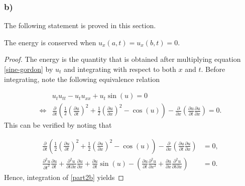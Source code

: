 \subsubsection*{b)} 
The following statement is proved in this section.
\begin{mydef}
The energy is conserved when $u_x(a,t) = u_x(b,t) = 0$.
\end{mydef}
\begin{proof}
The energy is the quantity that is obtained after multiplying equation \eqref{sine-gordon} by $u_t$ and integrating with respect to both $x$ and $t$. Before integrating, note the following equivalence relation

\begin{equation}
\begin{split}
    &u_tu_{tt} - u_tu_{xx} + u_t\sin{(u)} = 0 \\
    \iff &\frac{\partial}{\partial t}\left(\frac{1}{2}\left(\frac{\partial u}{\partial t}\right)^2 + \frac{1}{2}\left(\frac{\partial u}{\partial x}\right)^2 - \cos{(u)}\right) - \frac{\partial }{\partial x}\left(\frac{\partial u}{\partial t}\frac{\partial u}{\partial x}\right) = 0.
\label{part2b}
\end{split}
\end{equation}
This can be verified by noting that

\begin{equation*}
\begin{split}
    \frac{\partial}{\partial t}\left(\frac{1}{2}\left(\frac{\partial u}{\partial t}\right)^2 + \frac{1}{2}\left(\frac{\partial u}{\partial x}\right)^2 - \cos{(u)}\right) - \frac{\partial }{\partial x}\left(\frac{\partial u}{\partial t}\frac{\partial u}{\partial x}\right) &= 0, \\
    \frac{\partial^2 u}{\partial t^2}\frac{\partial u}{\partial t} + \frac{\partial^2 u}{\partial t \partial x}\frac{\partial u}{\partial x} + \frac{\partial u}{\partial t}\sin{(u)} - \left(\frac{\partial u}{\partial t}\frac{\partial^2 u}{\partial x^2} + \frac{\partial u}{\partial x}\frac{\partial^2 u}{\partial t\partial x}\right) &= 0.
\end{split}
\end{equation*}
Hence, integration of \eqref{part2b} yields


\end{proof}
